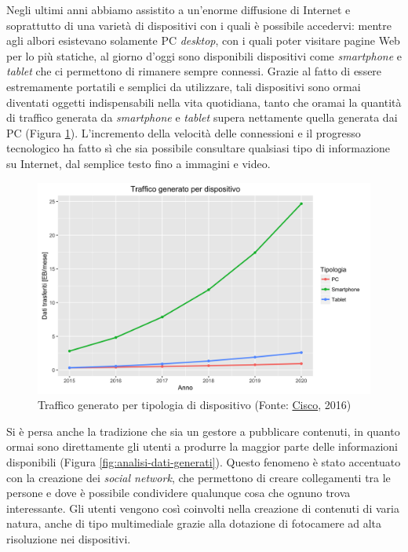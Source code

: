 Negli ultimi anni abbiamo assistito a un'enorme diffusione di Internet e soprattutto di una varietà di dispositivi con i quali è possibile accedervi: mentre agli albori esistevano solamente PC \emph{desktop}, con i quali poter visitare pagine Web per lo più statiche, al giorno d'oggi sono disponibili dispositivi come \emph{smartphone} e \emph{tablet} che ci permettono di rimanere sempre connessi. Grazie al fatto di essere estremamente portatili e semplici da utilizzare, tali dispositivi sono ormai diventati oggetti indispensabili nella vita quotidiana, tanto che oramai la quantità di traffico generata da \emph{smartphone} e \emph{tablet} supera nettamente quella generata dai PC (Figura \ref{fig:traffico-tipologia-dispositivo}). L'incremento della velocità delle connessioni e il progresso tecnologico ha fatto sì che sia possibile consultare qualsiasi tipo di informazione su Internet, dal semplice testo fino a immagini e video.

\begin{figure}[ht]
	\centering
	\includegraphics[width=\textwidth]{1-introduzione/Immagini/traffico-dispositivi.png}
	\caption[Traffico generato per tipologia di dispositivo]{Traffico generato per tipologia di dispositivo (Fonte: \href{http://www.cisco.com/c/en/us/solutions/collateral/service-provider/visual-networking-index-vni/mobile-white-paper-c11-520862.html}{Cisco}, 2016)\label{fig:traffico-tipologia-dispositivo}}
\end{figure}

Si è persa anche la tradizione che sia un gestore a pubblicare contenuti, in quanto ormai sono direttamente gli utenti a produrre la maggior parte delle informazioni disponibili (Figura \ref{fig:analisi-dati-generati}). Questo fenomeno è stato accentuato con la creazione dei \emph{social network}, che permettono di creare collegamenti tra le persone e dove è possibile condividere qualunque cosa che ognuno trova interessante. Gli utenti vengono così coinvolti nella creazione di contenuti di varia natura, anche di tipo multimediale grazie alla dotazione di fotocamere ad alta risoluzione nei dispositivi.

